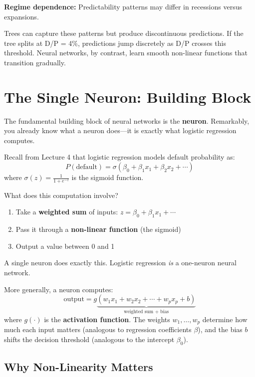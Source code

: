 \documentclass[11pt,a4paper]{article}
\newcommand{\keyword}[1]{\textbf{\textcolor{AccentOrange}{#1}}}
\begin{document}
\textbf{Regime dependence:} Predictability patterns may differ in recessions versus expansions.

Trees can capture these patterns but produce discontinuous predictions. If the tree splits at D/P = 4\%, predictions jump discretely as D/P crosses this threshold. Neural networks, by contrast, learn smooth non-linear functions that transition gradually.

\section{The Single Neuron: Building Block}

The fundamental building block of neural networks is the \keyword{neuron}. Remarkably, you already know what a neuron does---it is exactly what logistic regression computes.

Recall from Lecture 4 that logistic regression models default probability as:
\[
P(\text{default}) = \sigma(\beta_0 + \beta_1 x_1 + \beta_2 x_2 + \cdots)
\]
where $\sigma(z) = \frac{1}{1 + e^{-z}}$ is the sigmoid function.

What does this computation involve?
\begin{enumerate}
    \item Take a \textbf{weighted sum} of inputs: $z = \beta_0 + \beta_1 x_1 + \cdots$
    \item Pass it through a \textbf{non-linear function} (the sigmoid)
    \item Output a value between 0 and 1
\end{enumerate}

A single neuron does exactly this. Logistic regression \textit{is} a one-neuron neural network.

More generally, a neuron computes:
\[
\text{output} = g\underbrace{(w_1 x_1 + w_2 x_2 + \cdots + w_p x_p + b)}_{\text{weighted sum + bias}}
\]
where $g(\cdot)$ is the \keyword{activation function}. The weights $w_1, \ldots, w_p$ determine how much each input matters (analogous to regression coefficients $\beta$), and the bias $b$ shifts the decision threshold (analogous to the intercept $\beta_0$).

\subsection{Why Non-Linearity Matters}
\end{document}
